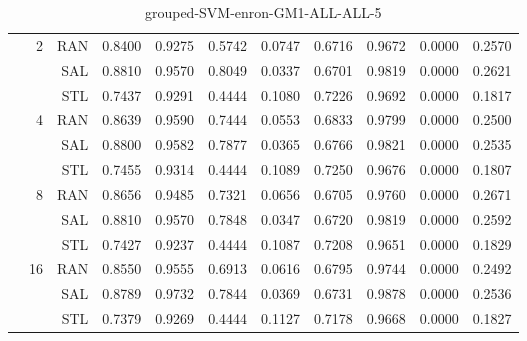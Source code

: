 \begin{center}
\begin{table}[htbp]
\begin{center}
\begin{tabular}{ | r | r | r | r | r | r | r | r | r | r | r |}
 & \multirow{3}{*}{2} & RAN & 0.8400 & 0.9275 & 0.5742 & 0.0747 & 0.6716 & 0.9672 & 0.0000 & 0.2570\\ \cline{3-11}
 &   & SAL & 0.8810 & 0.9570 & 0.8049 & 0.0337 & 0.6701 & 0.9819 & 0.0000 & 0.2621\\ \cline{3-11}
 &   & STL & 0.7437 & 0.9291 & 0.4444 & 0.1080 & 0.7226 & 0.9692 & 0.0000 & 0.1817\\ \cline{2-11}
 & \multirow{3}{*}{4} & RAN & 0.8639 & 0.9590 & 0.7444 & 0.0553 & 0.6833 & 0.9799 & 0.0000 & 0.2500\\ \cline{3-11}
 &   & SAL & 0.8800 & 0.9582 & 0.7877 & 0.0365 & 0.6766 & 0.9821 & 0.0000 & 0.2535\\ \cline{3-11}
 &   & STL & 0.7455 & 0.9314 & 0.4444 & 0.1089 & 0.7250 & 0.9676 & 0.0000 & 0.1807\\ \cline{2-11}
 & \multirow{3}{*}{8} & RAN & 0.8656 & 0.9485 & 0.7321 & 0.0656 & 0.6705 & 0.9760 & 0.0000 & 0.2671\\ \cline{3-11}
 &   & SAL & 0.8810 & 0.9570 & 0.7848 & 0.0347 & 0.6720 & 0.9819 & 0.0000 & 0.2592\\ \cline{3-11}
 &   & STL & 0.7427 & 0.9237 & 0.4444 & 0.1087 & 0.7208 & 0.9651 & 0.0000 & 0.1829\\ \cline{2-11}
 & \multirow{3}{*}{16} & RAN & 0.8550 & 0.9555 & 0.6913 & 0.0616 & 0.6795 & 0.9744 & 0.0000 & 0.2492\\ \cline{3-11}
 &   & SAL & 0.8789 & 0.9732 & 0.7844 & 0.0369 & 0.6731 & 0.9878 & 0.0000 & 0.2536\\ \cline{3-11}
 &   & STL & 0.7379 & 0.9269 & 0.4444 & 0.1127 & 0.7178 & 0.9668 & 0.0000 & 0.1827\\ \cline{2-11}
\hline
\end{tabular}
\caption{grouped-SVM-enron-GM1-ALL-ALL-5}
\end{center}
 \end{table}
\end{center}

